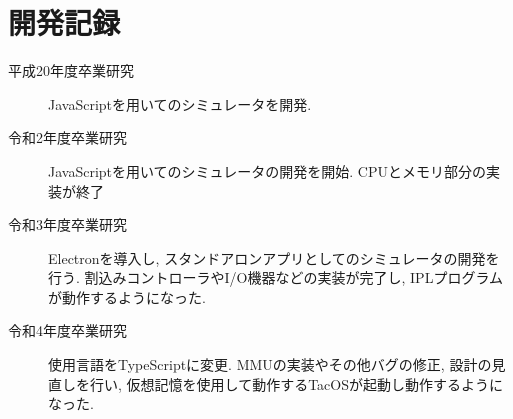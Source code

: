\section{開発記録}

\begin{description}
    \item[平成20年度卒業研究] JavaScriptを用いて\tec のシミュレータを開発.
    \item[令和2年度卒業研究] JavaScriptを用いて\tac のシミュレータの開発を開始. CPUとメモリ部分の実装が終了
    \item[令和3年度卒業研究] Electronを導入し, スタンドアロンアプリとして\tac のシミュレータの開発を行う. 割込みコントローラやI/O機器などの実装が完了し, IPLプログラムが動作するようになった.
    \item[令和4年度卒業研究] 使用言語をTypeScriptに変更. MMUの実装やその他バグの修正, 設計の見直しを行い, 仮想記憶を使用して動作するTacOSが起動し動作するようになった.
\end{description}